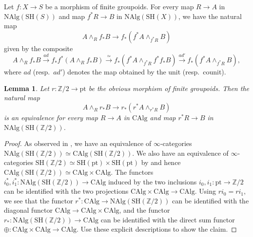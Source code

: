 \documentclass[10pt]{amsart}
\newtheorem{lem}[thm]{Lemma}
\theoremstyle{definition}
\theoremstyle{remark}
\numberwithin{equation}{section}
\newcommand{\Z}{\mathbb{Z}}
\newcommand{\CAlg}{\mathrm{CAlg}}
\newcommand{\NAlg}{\mathrm{NAlg}}
\newcommand{\pt}{\mathrm{pt}}
\newcommand{\SH}{\mathrm{SH}}
\newcommand{\Ztwo}{{\mathbb{Z}/2}}
\begin{document}
Let $f\colon X\to S$ be a morphism of finite groupoids.
For every map $R\to A$ in $\NAlg(\SH(S))$ and map $f^*R\to B$ in $\NAlg(\SH(X))$,
we have the natural map
\[
A\wedge_R f_*B
\to
f_*(f^*A\wedge_{f^*R}B)
\]
given by the composite
\[
A\wedge_R f_*B
\xrightarrow{ad}
f_*f^*(A\wedge_R f_*B)
\xrightarrow{\simeq}
f_*(f^*A \wedge_{f^*R} f^*f_*B)
\xrightarrow{ad'}
f_*(f^*A \wedge_{f^*R} B),
\]
where $ad$ (resp.\ $ad'$) denotes the map obtained by the unit (resp.\ counit).


\begin{lem}
\label{thrlog.7}
Let $r\colon \Ztwo\to \pt$ be the obvious morphism of finite groupoids.
Then the natural map
\[
A\wedge_R r_*B
\to
r_*(r^*A\wedge_{r^*R} B)
\]
is an equivalence for every map $R\to A$ in $\CAlg$ and map $r^*R\to B$ in $\NAlg(\SH(\Ztwo))$.
\end{lem}
\begin{proof}
As observed in \cite[Example 9.15]{BH21},
we have an equivalence of $\infty$-categories $\NAlg(\SH(\Z/2))\simeq \CAlg(\SH(\Z/2))$.
We also have an equivalence of $\infty$-categories $\SH(\Z/2)\simeq \SH(\pt) \times \SH(\pt)$ by \cite[Lemma 9.6]{BH21} and hence $\CAlg(\SH(\Z/2))\simeq \CAlg\times \CAlg$.
The functors $i_0^*,i_1^*\colon \NAlg(\SH(\Ztwo))\to \CAlg$ induced by the two inclusions $i_0,i_1\colon \pt\to \Z/2$ can be identified with the two projections $\CAlg\times \CAlg\to \CAlg$.
Using $ri_0=ri_1$,
we see that the functor $r^*\colon \CAlg\to \NAlg(\SH(\Ztwo))$ can be identified with the diagonal functor $\CAlg \to \CAlg\times \CAlg$, and the functor $r_*\colon \NAlg(\SH(\Ztwo))\to \CAlg$ can be identified with the direct sum functor $\oplus \colon \CAlg\times \CAlg\to \CAlg$.
Use these explicit descriptions to show the claim.
\end{proof}
\end{document}

